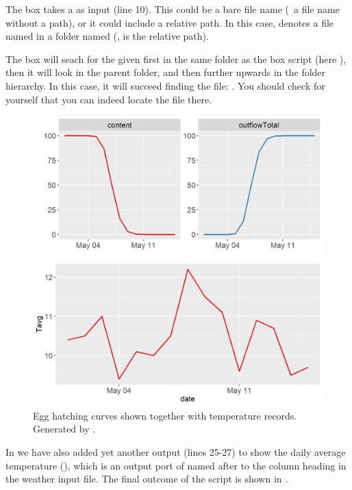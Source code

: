 The  box takes a  as input (line 10). This could be a bare file name (\ie\ a file name without a path), or it could include a relative path. In this case,  denotes a file named  in a folder named  (\ie,  is the relative path). 

The  box will seach for the given  first in the same folder as the box script (here ), then it will look in the parent folder, and then further upwards in the folder hierarchy. In this case, it will succeed finding the file: . You should check for yourself that you can indeed locate the file there.

\begin{figure} 
\centering
\includegraphics[scale=0.5]{graphics/egg4}
\caption{Egg hatching curves shown together with temperature records. Generated by .}
\label{fig:egg4}
\end{figure}

In  we have also added yet another  output (lines 25-27) to show the daily average temperature (), which is an output port of  named after to the column heading in the weather input file. The final outcome of the script is shown in .

